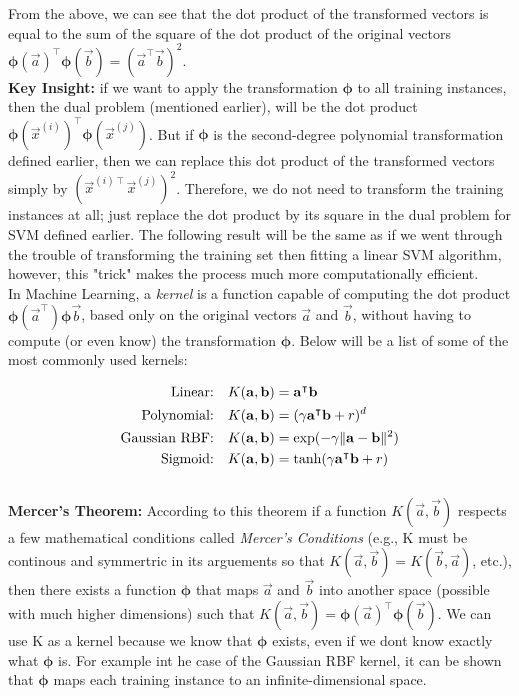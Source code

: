 \noindent
From the above, we can see that the dot product of the transformed vectors is equal to the sum of the square of the 
dot product of the original vectors 
$\boldsymbol{\phi}(\vec{a})^{\intercal}\boldsymbol{\phi}(\vec{b}) = (\vec{a}^{\intercal}\vec{b})^{2}$.\\

\noindent
\textbf{Key Insight:} if we want to apply the transformation $\boldsymbol{\phi}$ to all training instances, then
the dual problem (mentioned earlier), will be the dot product 
$\boldsymbol{\phi}(\vec{x}^{(i)})^{\intercal}\boldsymbol{\phi}(\vec{x}^{(j)})$. But if $\boldsymbol{\phi}$ is 
the second-degree polynomial transformation defined earlier, then we can replace this dot product of the 
transformed vectors simply by $(\vec{x}^{(i)\intercal}\vec{x}^{(j)})^{2}$. Therefore, we do not need to transform
the training instances at all; just replace the dot product by its square in the dual problem for SVM defined 
earlier. The following result will be the same as if we went through the trouble of transforming the training 
set then fitting a linear SVM algorithm, however, this "trick" makes the process much more computationally
efficient. \\

\noindent
In Machine Learning, a \textit{kernel} is a function capable of computing the dot product 
$\boldsymbol{\phi}(\vec{a}^{\intercal})\boldsymbol{\phi}\vec{b}$, based only on the original vectors $\vec{a}$ 
and $\vec{b}$, without having to compute (or even know) the transformation $\boldsymbol{\phi}$. Below will be a 
list of some of the most commonly used kernels:

\[
\begin{aligned}
\textrm{Linear:} \quad & K(\mathbf{a}, \mathbf{b}) = \mathbf{a}^{\intercal}\mathbf{b} \\
\textrm{Polynomial:} \quad & K(\mathbf{a}, \mathbf{b}) = (\gamma\mathbf{a}^{\intercal}\mathbf{b} + r)^{d} \\
\textrm{Gaussian RBF:} \quad & K(\mathbf{a}, \mathbf{b}) = \textrm{exp}(-\gamma \lVert\mathbf{a} - \mathbf{b}\rVert^{2}) \\
\textrm{Sigmoid:} \quad & K(\mathbf{a}, \mathbf{b}) = \textrm{tanh}(\gamma\mathbf{a}^{\intercal}\mathbf{b} + r)
\end{aligned}
\] \\

\noindent
\textbf{Mercer's Theorem:} According to this theorem if a function $K(\vec{a}, \vec{b})$ respects a few 
mathematical conditions called \textit{Mercer's Conditions} (e.g., K must be continous and symmertric in its 
arguements so that $K(\vec{a}, \vec{b}) = K(\vec{b}, \vec{a})$, etc.), then there exists a function 
$\boldsymbol{\phi}$ that maps $\vec{a}$ and $\vec{b}$ into another space (possible with much higher dimensions) 
such that $K(\vec{a}, \vec{b}) = \boldsymbol{\phi}(\vec{a})^{\intercal} \boldsymbol{\phi}(\vec{b})$. We can use 
K as a kernel because we know that $\boldsymbol{\phi}$ exists, even if we dont know exactly what 
$\boldsymbol{\phi}$ is. For example int he case of the Gaussian RBF kernel, it can be shown that 
$\boldsymbol{\phi}$ maps each training instance to an infinite-dimensional space.\\

